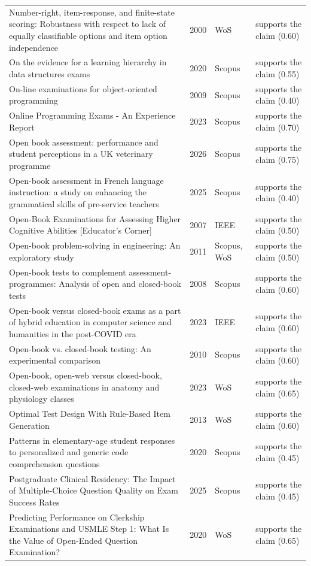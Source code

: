 \begin{longtable}{@{}%
  >{\raggedright\arraybackslash}p{}c%
  >{\raggedright\arraybackslash}p{}%
  >{\raggedright\arraybackslash}p{}@{}}
Number-right, item-response, and finite-state scoring: Robustness with respect to lack of equally classifiable options and item option independence & 2000 & WoS & supports the claim (0.60) \\
On the evidence for a learning hierarchy in data structures exams & 2020 & Scopus & supports the claim (0.55) \\
On-line examinations for object-oriented programming & 2009 & Scopus & supports the claim (0.40) \\
Online Programming Exams - An Experience Report & 2023 & Scopus & supports the claim (0.70) \\
Open book assessment: performance and student perceptions in a UK veterinary programme & 2026 & Scopus & supports the claim (0.75) \\
Open-book assessment in French language instruction: a study on enhancing the grammatical skills of pre-service teachers & 2025 & Scopus & supports the claim (0.40) \\
Open-Book Examinations for Assessing Higher Cognitive Abilities [Educator's Corner] & 2007 & IEEE & supports the claim (0.50) \\
Open-book problem-solving in engineering: An exploratory study & 2011 & Scopus, WoS & supports the claim (0.50) \\
Open-book tests to complement assessment-programmes: Analysis of open and closed-book tests & 2008 & Scopus & supports the claim (0.60) \\
Open-book versus closed-book exams as a part of hybrid education in computer science and humanities in the post-COVID era & 2023 & IEEE & supports the claim (0.60) \\
Open-book vs. closed-book testing: An experimental comparison & 2010 & Scopus & supports the claim (0.60) \\
Open-book, open-web versus closed-book, closed-web examinations in anatomy and physiology classes & 2023 & WoS & supports the claim (0.65) \\
Optimal Test Design With Rule-Based Item Generation & 2013 & WoS & supports the claim (0.60) \\
Patterns in elementary-age student responses to personalized and generic code comprehension questions & 2020 & Scopus & supports the claim (0.45) \\
Postgraduate Clinical Residency: The Impact of Multiple-Choice Question Quality on Exam Success Rates & 2025 & Scopus & supports the claim (0.45) \\
Predicting Performance on Clerkship Examinations and USMLE Step 1: What Is the Value of Open-Ended Question Examination? & 2020 & WoS & supports the claim (0.65) \\

\end{longtable}
